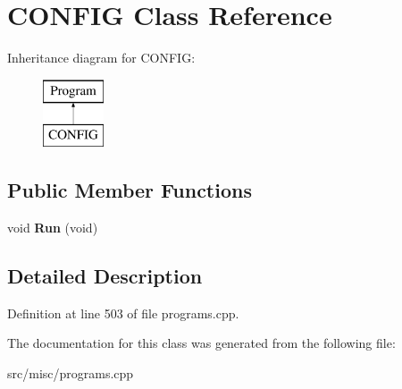 \hypertarget{classCONFIG}{\section{C\-O\-N\-F\-I\-G Class Reference}
\label{classCONFIG}
}
Inheritance diagram for C\-O\-N\-F\-I\-G\-:\begin{figure}[H]
\begin{center}
\leavevmode
\includegraphics[height=2.000000cm]{classCONFIG}
\end{center}
\end{figure}
\subsection*{Public Member Functions}
\begin{DoxyCompactItemize}
\item 
\hypertarget{classCONFIG_a70fa41a171a274d6f1ef63cbfd2928ef}{void {\bfseries Run} (void)}\label{classCONFIG_a70fa41a171a274d6f1ef63cbfd2928ef}

\end{DoxyCompactItemize}


\subsection{Detailed Description}


Definition at line 503 of file programs.\-cpp.



The documentation for this class was generated from the following file\-:\begin{DoxyCompactItemize}
\item 
src/misc/programs.\-cpp\end{DoxyCompactItemize}
